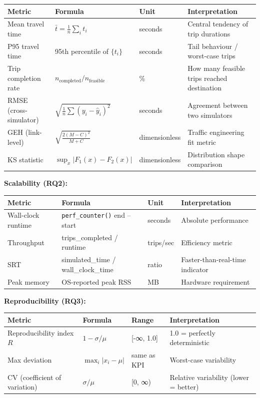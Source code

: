 \begin{longtable}[]{@{}llll@{}}
\toprule\noalign{}
Metric & Formula & Unit & Interpretation \\
\midrule\noalign{}
\endhead
\bottomrule\noalign{}
\endlastfoot
Mean travel time & \(\bar{t} = \frac{1}{n}\sum_i t_i\) & seconds &
Central tendency of trip durations \\
P95 travel time & 95th percentile of \(\{t_i\}\) & seconds & Tail
behaviour / worst-case trips \\
Trip completion rate & \(n_\text{completed} / n_\text{feasible}\) & \% &
How many feasible trips reached destination \\
RMSE (cross-simulator) & \(\sqrt{\frac{1}{n}\sum(y_i - \hat{y}_i)^2}\) &
seconds & Agreement between two simulators \\
GEH (link-level) & \(\sqrt{\frac{2(M-C)^2}{M+C}}\) & dimensionless &
Traffic engineering fit metric \\
KS statistic & \(\sup_x |F_1(x) - F_2(x)|\) & dimensionless &
Distribution shape comparison \\
\end{longtable}

\textbf{Scalability (RQ2):}

\begin{longtable}[]{@{}llll@{}}
\toprule\noalign{}
Metric & Formula & Unit & Interpretation \\
\midrule\noalign{}
\endhead
\bottomrule\noalign{}
\endlastfoot
Wall-clock runtime & \texttt{perf\_counter()} end -- start & seconds &
Absolute performance \\
Throughput & trips\_completed / runtime & trips/sec & Efficiency
metric \\
SRT & simulated\_time / wall\_clock\_time & ratio &
Faster-than-real-time indicator \\
Peak memory & OS-reported peak RSS & MB & Hardware requirement \\
\end{longtable}

\textbf{Reproducibility (RQ3):}

\begin{longtable}[]{@{}llll@{}}
\toprule\noalign{}
Metric & Formula & Range & Interpretation \\
\midrule\noalign{}
\endhead
\bottomrule\noalign{}
\endlastfoot
Reproducibility index \(R\) & \(1 - \sigma/\mu\) & {[}-∞, 1.0{]} & 1.0 =
perfectly deterministic \\
Max deviation & \(\max_i |x_i - \mu|\) & same as KPI & Worst-case
variability \\
CV (coefficient of variation) & \(\sigma/\mu\) & {[}0, ∞) & Relative
variability (lower = better) \\
\end{longtable}


